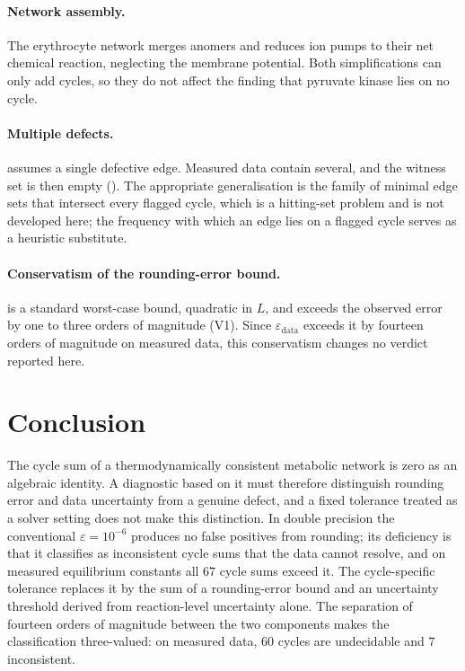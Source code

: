 \documentclass[11pt,a4paper]{article}
\theoremstyle{pstyle}
\theoremstyle{definition}
\theoremstyle{remark}
\newcommand{\eps}{\varepsilon}
\newcommand{\epsdata}{\eps_{\mathrm{data}}}
\begin{document}
\paragraph{Network assembly.} The erythrocyte network merges anomers and
reduces ion pumps to their net chemical reaction, neglecting the
membrane potential. Both simplifications can only add cycles, so they
do not affect the finding that pyruvate kinase lies on no cycle.

\paragraph{Multiple defects.}  assumes a
single defective edge. Measured data contain several, and the witness
set is then empty (). The appropriate generalisation
is the family of minimal edge sets that intersect every flagged cycle,
which is a hitting-set problem and is not developed here; the frequency
with which an edge lies on a flagged cycle serves as a heuristic
substitute.

\paragraph{Conservatism of the rounding-error bound.}
 is a standard worst-case bound, quadratic in $L$,
and exceeds the observed error by one to three orders of magnitude
(V1). Since $\epsdata$ exceeds it by fourteen orders of magnitude on
measured data, this conservatism changes no verdict reported here.

\section{Conclusion}
\label{sec:conclusion}

The cycle sum of a thermodynamically consistent metabolic network is
zero as an algebraic identity. A diagnostic based on it must therefore
distinguish rounding error and data uncertainty from a genuine defect,
and a fixed tolerance treated as a solver setting does not make this
distinction. In double precision the conventional $\eps=10^{-6}$
produces no false positives from rounding; its deficiency is that it
classifies as inconsistent cycle sums that the data cannot resolve, and
on measured equilibrium constants all $67$ cycle sums exceed it. The
cycle-specific tolerance replaces it by the sum of a rounding-error
bound and an uncertainty threshold derived from reaction-level
uncertainty alone. The separation of fourteen orders of magnitude
between the two components makes the classification three-valued: on
measured data, $60$ cycles are undecidable and $7$ inconsistent.
\end{document}
